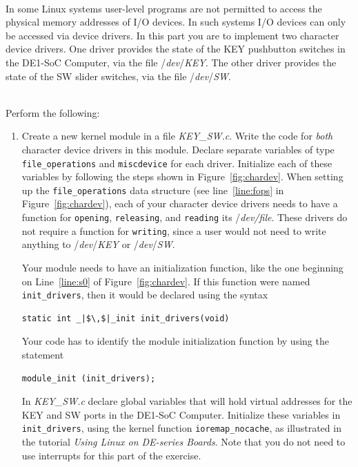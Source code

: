\documentclass[epsfig,10pt,fullpage]{article}
\begin{document}
~\\
\noindent
In some Linux systems user-level programs are not permitted to access the physical memory 
addresses of I/O devices. In such systems I/O devices can only be accessed via device
drivers. In this part you are to implement two character device drivers. One driver provides the
state of the KEY pushbutton switches in the DE1-SoC Computer, via the file 
/{\it dev}/{\it KEY}. The other driver provides the state of the SW slider switches, via
the file /{\it dev}/{\it SW}.

~\\
\noindent
Perform the following:

\begin{enumerate}
\item Create a new kernel module in a file {\it KEY\_SW.c}. Write the code for {\it both}
character device drivers in this module. Declare separate variables of type
\texttt{file\_operations} and \texttt{miscdevice} for each driver. 
Initialize each of these variables by
following the steps shown in Figure~\ref{fig:chardev}. When setting up the 
\texttt{file\_operations} data structure (see line~\ref{line:fops} in Figure~\ref{fig:chardev}), 
each of your character device drivers needs to have a function for \texttt{opening}, 
\texttt{releasing}, and \texttt{reading} its /{\it dev/file}. These drivers do not 
require a function for \texttt{writing}, since a user would not need to write anything 
to /{\it dev}/{\it KEY} or /{\it dev}/{\it SW}.

\noindent
Your module needs to have an initialization function, like the one beginning on Line~\ref{line:s0}
of Figure~\ref{fig:chardev}. If this function were named \texttt{init\_drivers}, then it 
would be declared using the syntax

\begin{lstlisting}
static int _|$\,$|_init init_drivers(void)
\end{lstlisting}

\noindent Your code has to identify the module initialization function by using the statement
\begin{lstlisting}
module_init (init_drivers);
\end{lstlisting}

\noindent
In {\it KEY\_SW.c} declare global variables that will hold virtual addresses for the KEY
and SW ports in the DE1-SoC Computer. Initialize these variables in
\texttt{init\_drivers}, using the kernel function \texttt{ioremap\_nocache}, as
illustrated in the tutorial {\it Using Linux on DE-series Boards}. Note that you do not need to 
use interrupts for this part of the exercise. 


\end{enumerate}
\end{document}
